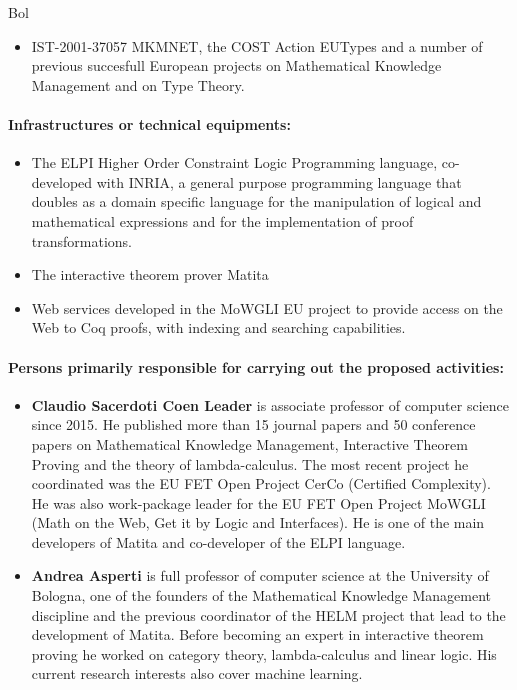 \begin{sitedescription}{Bol}
\begin{itemize}
\item IST-2001-37057 MKMNET, the COST Action EUTypes and a number of previous succesfull European projects on Mathematical Knowledge Management and on Type Theory.
\end{itemize}

\paragraph{Infrastructures or technical equipments:}
\begin{itemize}
\item The ELPI Higher Order Constraint Logic Programming language, co-developed with INRIA, a general purpose programming language that doubles as a domain specific language for the manipulation of logical and mathematical expressions and for the implementation of proof transformations.
\item The interactive theorem prover Matita
\item Web services developed in the MoWGLI EU project to provide access on the Web to Coq proofs, with indexing and searching capabilities.
\end{itemize}

\paragraph{Persons primarily responsible for carrying out the proposed activities:}

\begin{itemize}
\item \textbf{Claudio Sacerdoti Coen Leader} is associate professor of computer science since 2015. He published more than 15 journal papers and 50 conference papers on Mathematical Knowledge Management, Interactive Theorem Proving and the theory of lambda-calculus. The most recent project he coordinated was the EU FET Open Project CerCo (Certified Complexity). He was also work-package leader for the EU FET Open Project MoWGLI (Math on the Web, Get it by Logic and Interfaces). He is one of the main developers of Matita and co-developer of the ELPI language.

\item \textbf{Andrea Asperti} is full professor of computer science at the University of Bologna, one of the founders of the Mathematical Knowledge Management discipline and the previous coordinator of the HELM project that lead to the development of Matita. Before becoming an expert in interactive theorem proving he worked on category theory, lambda-calculus and linear logic. His current research interests also cover machine learning.
\end{itemize}

\end{sitedescription}

